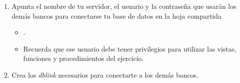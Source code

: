 \begin{homeworkProblem}
  
  \begin{enumerate}
  \item Apunta el nombre de tu servidor, el usuario y la contraseña que usarán los demás bancos para conectarse tu base de datos en la hoja compartida 
    \begin{itemize}
      \item {}.
    \item Recuerda que ese usuario debe tener privilegios para utilizar las vistas, funciones y procedimientos del ejercicio.
    \end{itemize}
  
  \item Crea los \textit{dblink} necesarios para conectarte a los demás bancos.

    
\end{enumerate}
\end{homeworkProblem}

